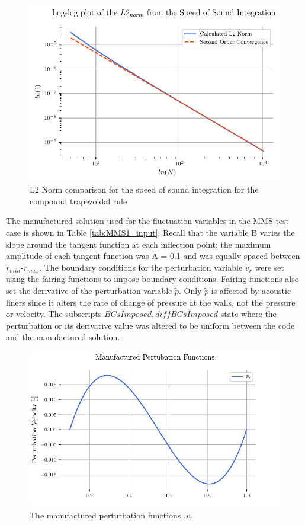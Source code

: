 \begin{figure}[h!]
    \centering
    \includegraphics{../../../CodeRun/04-plotReport/tex-outputs/MMS1_SpeedOfSoundComparisonL2.pdf}
    \caption{L2 Norm comparison for the speed of sound integration for the compound trapezoidal rule}
    \label{fig:8}
\end{figure}

The manufactured solution used for the fluctuation variables in the MMS test case
is shown in Table \ref{tab:MMS1_input}. Recall that the variable B varies the slope around the
tangent function at each inflection point; the maximum amplitude of each tangent
function was A = 0.1 and was equally spaced between $\tilde{r}_{min}$-$\tilde{r}_{max}$.  
The boundary conditions for the perturbation variable $\tilde{v}_r$ were set 
using the fairing functions to impose boundary conditions. Fairing functions 
also set the derivative of the perturbation variable $\tilde{p}$. Only $\tilde{p}$
is affected by acoustic liners since it alters the rate of change of pressure at 
the walls, not the pressure or velocity. The subscripts $BCsImposed, diffBCsImposed$
state where the perturbation or its derivative value was altered to be uniform between the code and
the manufactured solution.


\begin{figure}[h!]
    \centering
    \includegraphics{../../../CodeRun/04-plotReport/tex-outputs/MMS1_perturbation_variables_vR.pdf}
\caption{The manufactured perturbation functions ,$v_r$}%
    \label{fig:1a}
\end{figure}

